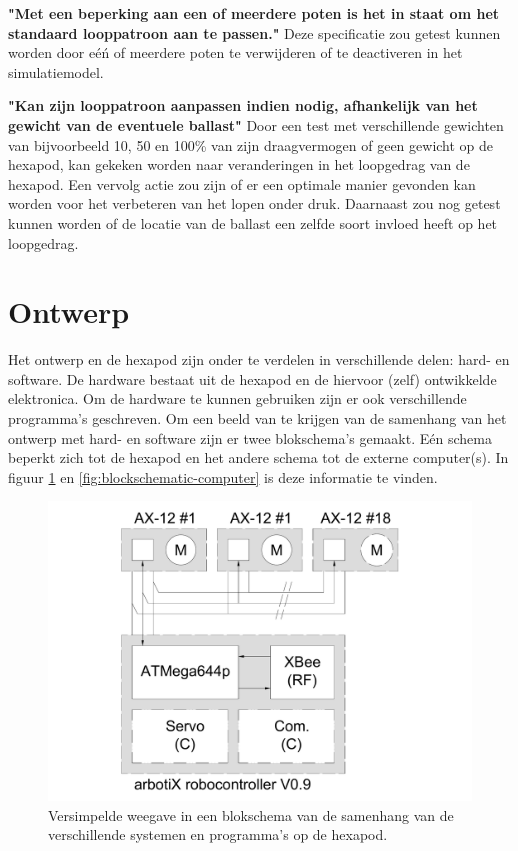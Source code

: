 \documentclass[10pt,a4paper]{article}
\begin{document}
\textbf{"Met een beperking aan een of meerdere poten is het in staat om het
standaard looppatroon aan te passen."} Deze specificatie zou getest kunnen worden door e\'e\'n of meerdere poten te verwijderen of te deactiveren in het simulatiemodel.

\textbf{"Kan zijn looppatroon aanpassen indien nodig, afhankelijk van het gewicht
van de eventuele ballast"} Door een test met verschillende gewichten van bijvoorbeeld 10, 50 en 100\% van zijn draagvermogen of geen gewicht op de hexapod, kan gekeken worden naar veranderingen in het loopgedrag van de hexapod. Een vervolg actie zou zijn of er een optimale manier gevonden kan worden voor het verbeteren van het lopen onder druk. Daarnaast zou nog getest kunnen worden of de locatie van de ballast een zelfde soort invloed heeft op het loopgedrag.



\newpage

\section{Ontwerp}
Het ontwerp en de hexapod zijn onder te verdelen in verschillende delen: hard- en software. De hardware bestaat uit de hexapod en de hiervoor (zelf) ontwikkelde elektronica. Om de hardware te kunnen gebruiken zijn er ook verschillende programma's geschreven. Om een beeld van te krijgen van de samenhang van het ontwerp met hard- en software zijn er twee blokschema's gemaakt. E\'en schema beperkt zich tot de hexapod en het andere schema tot de externe computer(s). In figuur \ref{fig:blockschematic-spider} en \ref{fig:blockschematic-computer} is deze informatie te vinden.

\begin{figure}[h]
    \centering
    \includegraphics[width=1\textwidth]{blockschematic-spider}
    \caption{Versimpelde weegave in een blokschema van de samenhang van de verschillende systemen en programma's op de hexapod.}
    \label{fig:blockschematic-spider}
\end{figure}
\end{document}
